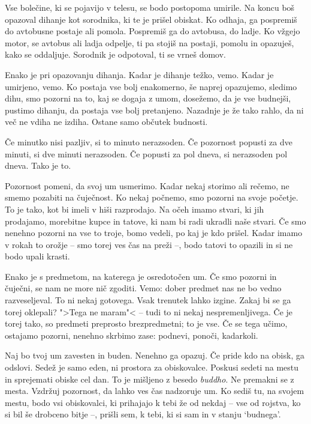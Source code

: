 Vse bolečine, ki se pojavijo v telesu, se bodo postopoma umirile. Na koncu boš opazoval dihanje kot sorodnika, ki te je prišel obiskat. Ko odhaja, ga pospremiš do avtobusne postaje ali pomola. Pospremiš ga do avtobusa, do ladje. Ko vžgejo motor, se avtobus ali ladja odpelje, ti pa stojiš na postaji, pomolu in opazuješ, kako se oddaljuje. Sorodnik je odpotoval, ti se vrneš domov.

Enako je pri opazovanju dihanja. Kadar je dihanje težko, vemo. Kadar je umirjeno, vemo. Ko postaja vse bolj enakomerno, še naprej opazujemo, sledimo dihu, smo pozorni na to, kaj se dogaja z umom, dosežemo, da je vse budnejši, pustimo dihanju, da postaja vse bolj pretanjeno. Nazadnje je že tako rahlo, da ni več ne vdiha ne izdiha. Ostane samo občutek budnosti.

\clearpage


Če minutko nisi pazljiv, si to minuto nerazsoden. Če pozornost popusti za dve minuti, si dve minuti nerazsoden. Če popusti za pol dneva, si nerazsoden pol dneva. Tako je to.

Pozornost pomeni, da svoj um usmerimo. Kadar nekaj storimo ali rečemo, ne smemo pozabiti na čuječnost. Ko nekaj počnemo, smo pozorni na svoje početje. To je tako, kot bi imeli v hiši razprodajo. Na očeh imamo stvari, ki jih prodajamo, morebitne kupce in tatove, ki nam bi radi ukradli naše stvari. Če smo nenehno pozorni na vse to troje, bomo vedeli, po kaj je kdo prišel. Kadar imamo v rokah to orožje – smo torej ves čas na preži –, bodo tatovi to opazili in si ne bodo upali krasti.

Enako je s predmetom, na katerega je osredotočen um. Če smo pozorni in čuječni, se nam ne more nič zgoditi. Vemo: dober predmet nas ne bo vedno razveseljeval. To ni nekaj gotovega. Vsak trenutek lahko izgine. Zakaj bi se ga torej oklepali? ">Tega ne maram"< – tudi to ni nekaj nespremenljivega. Če je torej tako, so predmeti preprosto brezpredmetni; to je vse. Če se tega učimo, ostajamo pozorni, nenehno skrbimo zase: podnevi, ponoči, kadarkoli.

\clearpage


Naj bo tvoj um zavesten in buden. Nenehno ga opazuj. Če pride kdo na obisk, ga odslovi. Sedež je samo eden, ni prostora za obiskovalce. Poskusi sedeti na mestu in sprejemati obiske cel dan. To je mišljeno z besedo \emph{buddho}. Ne premakni se z mesta. Vzdržuj pozornost, da lahko ves čas nadzoruje um. Ko sediš tu, na svojem mestu, bodo vsi obiskovalci, ki prihajajo k tebi že od nekdaj – vse od rojstva, ko si bil še drobceno bitje –, prišli sem, k tebi, ki si sam in v stanju `budnega'.

